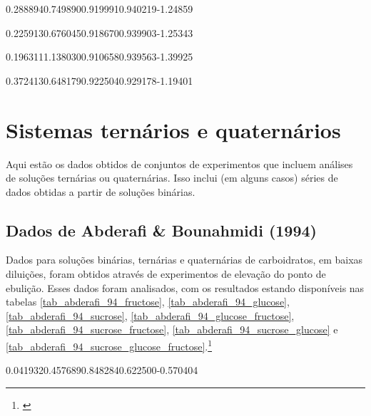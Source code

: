 %
	{0.288894}{0.749890}{0.919991}{0.940219}{-1.24859}

%
	{0.225913}{0.676045}{0.918670}{0.939903}{-1.25343}

%
	{0.196311}{1.138030}{0.910658}{0.939563}{-1.39925}

%
	{0.372413}{0.648179}{0.922504}{0.929178}{-1.19401}

\FloatBarrier

\section{Sistemas ternários e quaternários}

Aqui estão os dados obtidos de conjuntos de experimentos que incluem análises
de soluções ternárias ou quaternárias. Isso inclui (em alguns casos) séries de
dados obtidas a partir de soluções binárias.

\subsection{Dados de Abderafi \& Bounahmidi (1994)}

Dados para soluções binárias, ternárias e quaternárias de carboidratos, em baixas
diluições, foram obtidos através de experimentos de elevação do ponto de ebulição.
Esses dados foram analisados, com os resultados estando disponíveis nas tabelas
\ref{tab_abderafi_94_fructose}, \ref{tab_abderafi_94_glucose},
\ref{tab_abderafi_94_sucrose}, \ref{tab_abderafi_94_glucose_fructose},
\ref{tab_abderafi_94_sucrose_fructose}, \ref{tab_abderafi_94_sucrose_glucose} e
\ref{tab_abderafi_94_sucrose_glucose_fructose}.\footnote{\cite{abderafi1994}}

%
	{0.041932}{0.457689}{0.848284}{0.622500}{-0.570404}

